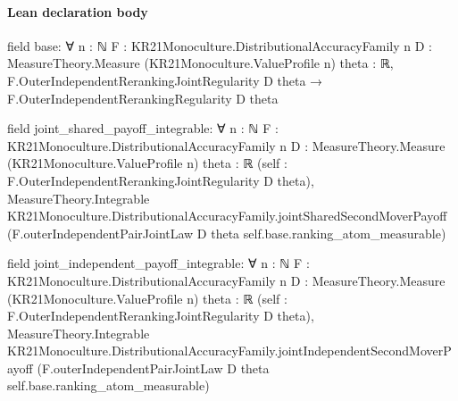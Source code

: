 \documentclass[10pt]{article}
\begin{document}
\paragraph{Lean declaration body}
\begin{ReviewVerbatim}
field base:
∀ {n : ℕ} {F : KR21Monoculture.DistributionalAccuracyFamily n}
  {D : MeasureTheory.Measure (KR21Monoculture.ValueProfile n)} {theta : ℝ},
  F.OuterIndependentRerankingJointRegularity D theta → F.OuterIndependentRerankingRegularity D theta

field joint_shared_payoff_integrable:
∀ {n : ℕ} {F : KR21Monoculture.DistributionalAccuracyFamily n}
  {D : MeasureTheory.Measure (KR21Monoculture.ValueProfile n)} {theta : ℝ}
  (self : F.OuterIndependentRerankingJointRegularity D theta),
  MeasureTheory.Integrable KR21Monoculture.DistributionalAccuracyFamily.jointSharedSecondMoverPayoff
    (F.outerIndependentPairJointLaw D theta self.base.ranking_atom_measurable)

field joint_independent_payoff_integrable:
∀ {n : ℕ} {F : KR21Monoculture.DistributionalAccuracyFamily n}
  {D : MeasureTheory.Measure (KR21Monoculture.ValueProfile n)} {theta : ℝ}
  (self : F.OuterIndependentRerankingJointRegularity D theta),
  MeasureTheory.Integrable KR21Monoculture.DistributionalAccuracyFamily.jointIndependentSecondMoverPayoff
    (F.outerIndependentPairJointLaw D theta self.base.ranking_atom_measurable)
\end{ReviewVerbatim}
\end{document}
